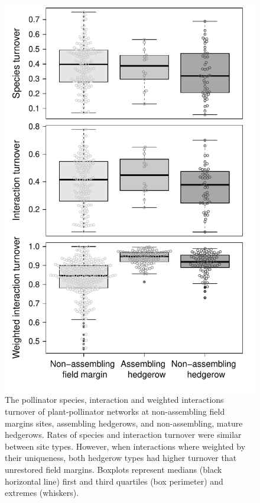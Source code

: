 \documentclass[12pt]{article}
\begin{document}
\begin{figure}
  \centering
  \includegraphics[width=.6\textwidth]{../analysis/variability/figures/turnover_panels.pdf}
  \caption{The pollinator species, interaction and weighted
    interactions turnover of plant-pollinator networks at
    non-assembling field margins sites, assembling hedgerows, and
    non-assembling, mature hedgerows. Rates of species and interaction
    turnover were similar between site types. However, when
    interactions where weighted by their uniqueness, both hedgerow
    types had higher turnover that unrestored field margins. Boxplots
    represent medians (black horizontal line) first and third
    quartiles (box perimeter) and extremes (whiskers). }
  \label{fig:beta}
\end{figure}
\clearpage
\end{document}
